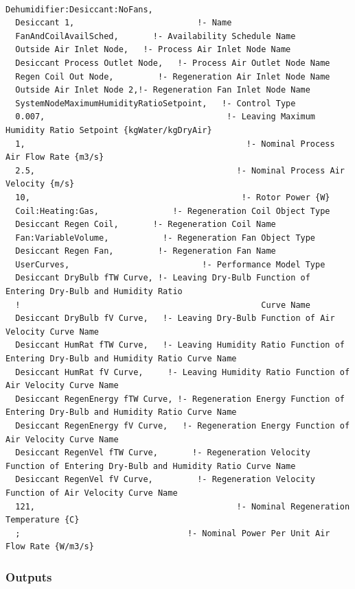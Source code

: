 \begin{lstlisting}

Dehumidifier:Desiccant:NoFans,
  Desiccant 1,                         !- Name
  FanAndCoilAvailSched,       !- Availability Schedule Name
  Outside Air Inlet Node,   !- Process Air Inlet Node Name
  Desiccant Process Outlet Node,   !- Process Air Outlet Node Name
  Regen Coil Out Node,         !- Regeneration Air Inlet Node Name
  Outside Air Inlet Node 2,!- Regeneration Fan Inlet Node Name
  SystemNodeMaximumHumidityRatioSetpoint,   !- Control Type
  0.007,                                     !- Leaving Maximum Humidity Ratio Setpoint {kgWater/kgDryAir}
  1,                                             !- Nominal Process Air Flow Rate {m3/s}
  2.5,                                         !- Nominal Process Air Velocity {m/s}
  10,                                           !- Rotor Power {W}
  Coil:Heating:Gas,               !- Regeneration Coil Object Type
  Desiccant Regen Coil,       !- Regeneration Coil Name
  Fan:VariableVolume,           !- Regeneration Fan Object Type
  Desiccant Regen Fan,         !- Regeneration Fan Name
  UserCurves,                           !- Performance Model Type
  Desiccant DryBulb fTW Curve, !- Leaving Dry-Bulb Function of Entering Dry-Bulb and Humidity Ratio
  !                                                 Curve Name
  Desiccant DryBulb fV Curve,   !- Leaving Dry-Bulb Function of Air Velocity Curve Name
  Desiccant HumRat fTW Curve,   !- Leaving Humidity Ratio Function of Entering Dry-Bulb and Humidity Ratio Curve Name
  Desiccant HumRat fV Curve,     !- Leaving Humidity Ratio Function of Air Velocity Curve Name
  Desiccant RegenEnergy fTW Curve, !- Regeneration Energy Function of Entering Dry-Bulb and Humidity Ratio Curve Name
  Desiccant RegenEnergy fV Curve,   !- Regeneration Energy Function of Air Velocity Curve Name
  Desiccant RegenVel fTW Curve,       !- Regeneration Velocity Function of Entering Dry-Bulb and Humidity Ratio Curve Name
  Desiccant RegenVel fV Curve,         !- Regeneration Velocity Function of Air Velocity Curve Name
  121,                                         !- Nominal Regeneration Temperature {C}
  ;                                  !- Nominal Power Per Unit Air Flow Rate {W/m3/s}
\end{lstlisting}

\subsubsection{Outputs}\label{outputs-008}

